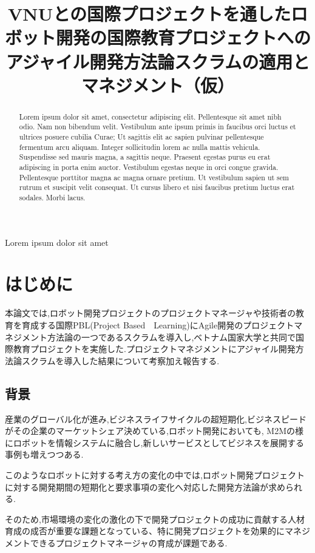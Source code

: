 \documentclass[paper]{jrsj}
\title{
VNUとの国際プロジェクトを通したロボット開発の国際教育プロジェクトへの
アジャイル開発方法論スクラムの適用とマネジメント（仮）
}
\subtitle{}
\begin{document}
\begin{abstract}
Lorem ipsum dolor sit amet, consectetur adipiscing elit. Pellentesque sit amet nibh odio. Nam non bibendum velit. Vestibulum ante ipsum primis in faucibus orci luctus et ultrices posuere cubilia Curae; Ut sagittis elit ac sapien pulvinar pellentesque fermentum arcu aliquam. Integer sollicitudin lorem ac nulla mattis vehicula. Suspendisse sed mauris magna, a sagittis neque. Praesent egestas purus eu erat adipiscing in porta enim auctor. Vestibulum egestas neque in orci congue gravida. Pellentesque porttitor magna ac magna ornare pretium. Ut vestibulum sapien ut sem rutrum et suscipit velit consequat. Ut cursus libero et nisi faucibus pretium luctus erat sodales. Morbi lacus.
\end{abstract}
\begin{keywords}
Lorem ipsum dolor sit amet
\end{keywords}
\maketitle
\small
\section{はじめに}

本論文では,ロボット開発プロジェクトのプロジェクトマネージャや技術者の教育を育成する国際PBL(Project
Based　Learning)にAgile開発のプロジェクトマネジメント方法論の一つであるスクラムを導入し,ベトナム国家大学と共同で国際教育プロジェクトを実施した.プロジェクトマネジメントにアジャイル開発方法論スクラムを導入した結果について考察加え報告する.

\subsection{背景}

産業のグローバル化が進み,ビジネスライフサイクルの超短期化,ビジネスピードがその企業のマーケットシェア決めている,ロボット開発においても, M2Mの様にロボットを情報システムに融合し,新しいサービスとしてビジネスを展開する事例も増えつつある.

このようなロボットに対する考え方の変化の中では,ロボット開発プロジェクトに対する開発期間の短期化と要求事項の変化へ対応した開発方法論が求められる.

そのため,市場環境の変化の激化の下で開発プロジェクトの成功に貢献する人材育成の成否が重要な課題となっている、特に開発プロジェクトを効果的にマネジメントできるプロジェクトマネージャの育成が課題である.
\end{document}
